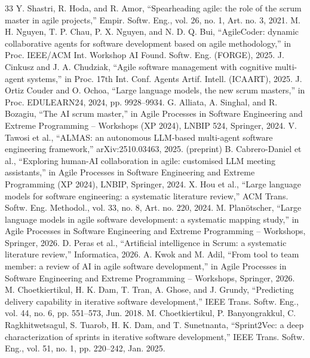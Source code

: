 \documentclass[conference]{IEEEtran}
\begin{document}
\begin{thebibliography}{33}
 Y. Shastri, R. Hoda, and R. Amor, ``Spearheading agile: the role of the scrum master in agile projects,'' Empir. Softw. Eng., vol. 26, no. 1, Art. no. 3, 2021.
 M. H. Nguyen, T. P. Chau, P. X. Nguyen, and N. D. Q. Bui, ``AgileCoder: dynamic collaborative agents for software development based on agile methodology,'' in Proc. IEEE/ACM Int. Workshop AI Found. Softw. Eng. (FORGE), 2025.
 J. Cinkusz and J. A. Chudziak, ``Agile software management with cognitive multi-agent systems,'' in Proc. 17th Int. Conf. Agents Artif. Intell. (ICAART), 2025.
 J. Ortiz Couder and O. Ochoa, ``Large language models, the new scrum masters,'' in Proc. EDULEARN24, 2024, pp. 9928--9934.
 G. Alliata, A. Singhal, and R. Bozagiu, ``The AI scrum master,'' in Agile Processes in Software Engineering and Extreme Programming -- Workshops (XP 2024), LNBIP 524, Springer, 2024.
 V. Tawosi et al., ``ALMAS: an autonomous LLM-based multi-agent software engineering framework,'' arXiv:2510.03463, 2025. (preprint)
 B. Cabrero-Daniel et al., ``Exploring human-AI collaboration in agile: customised LLM meeting assistants,'' in Agile Processes in Software Engineering and Extreme Programming (XP 2024), LNBIP, Springer, 2024.
 X. Hou et al., ``Large language models for software engineering: a systematic literature review,'' ACM Trans. Softw. Eng. Methodol., vol. 33, no. 8, Art. no. 220, 2024.
 M. Planötscher, ``Large language models in agile software development: a systematic mapping study,'' in Agile Processes in Software Engineering and Extreme Programming -- Workshops, Springer, 2026.
 D. Peras et al., ``Artificial intelligence in Scrum: a systematic literature review,'' Informatica, 2026.
 A. Kwok and M. Adil, ``From tool to team member: a review of AI in agile software development,'' in Agile Processes in Software Engineering and Extreme Programming -- Workshops, Springer, 2026.
 M. Choetkiertikul, H. K. Dam, T. Tran, A. Ghose, and J. Grundy, ``Predicting delivery capability in iterative software development,'' IEEE Trans. Softw. Eng., vol. 44, no. 6, pp. 551--573, Jun. 2018.
 M. Choetkiertikul, P. Banyongrakkul, C. Ragkhitwetsagul, S. Tuarob, H. K. Dam, and T. Sunetnanta, ``Sprint2Vec: a deep characterization of sprints in iterative software development,'' IEEE Trans. Softw. Eng., vol. 51, no. 1, pp. 220--242, Jan. 2025.

\end{thebibliography}
\end{document}
